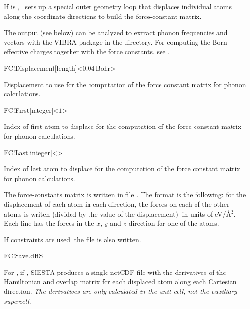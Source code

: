 If  is , \siesta\ sets up a special outer
geometry loop that displaces individual atoms along the coordinate
directions to build the force-constant matrix.

The output (see below) can be analyzed to extract phonon frequencies
and vectors with the VIBRA package in the 
directory. For computing the Born effective charges together with the
force constants, see .

\begin{fdfentry}{FC!Displacement}[length]<$0.04\,\mathrm{Bohr}$>

  Displacement to use for the computation of the force constant
  matrix for phonon calculations.

\end{fdfentry}

\begin{fdfentry}{FC!First}[integer]<$1$>

  Index of first atom to displace for the computation of the force
  constant matrix for phonon
  calculations.

\end{fdfentry}

\begin{fdfentry}{FC!Last}[integer]<>

  Index of last atom to displace for the computation of the force
  constant matrix for phonon
  calculations.

\end{fdfentry}

The force-constants matrix is written in file .  The
format is the following: for the displacement of each atom in each
direction, the forces on each of the other atoms is writen (divided by
the value of the displacement), in units of eV/\AA$^2$. Each line has
the forces in the $x$, $y$ and $z$ direction for one of the atoms.

If constraints are used, the file  is also written.

\begin{fdflogicalF}{FC!Save.dHS}

    For , if \fdftrue, SIESTA produces a single netCDF
    file  with the derivatives of the Hamiltonian and
    overlap matrix for each displaced atom along each Cartesian direction. 
    \textit{The derivatives are only calculated in the unit cell, not the 
    auxiliary supercell}.

\end{fdflogicalF}

